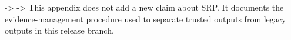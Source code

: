 \markdownRendererUlItem {} -> \markdownRendererUlItemEnd 
\markdownRendererUlItem {} -> \markdownRendererUlItemEnd 
\markdownRendererUlEndTight \markdownRendererInterblockSeparator
{}This appendix does not add a new claim about SRP.\markdownRendererSoftLineBreak
{}It documents the evidence-management procedure used to separate trusted outputs from legacy outputs in this release branch.
\markdownRendererSectionEnd 
\markdownRendererSectionEnd 
\markdownRendererSectionEnd \markdownRendererDocumentEnd